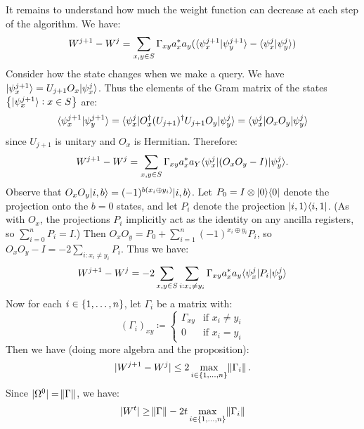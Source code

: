 It remains to understand how much the weight function can decrease at each step of the algorithm. We have:
\begin{equation}
    W^{j+1} - W^j = \sum_{x, y \in S} \Gamma_{xy}a_x^* a_y(\langle \psi_x^{j+1} \lvert \psi_y^{j+1} \rangle - \langle \psi_x^j \lvert \psi_y^j \rangle)
\end{equation}
Consider how the state changes when we make a query. We have $\lvert \psi_x^{j+1} \rangle = U_{j+1}O_x\lvert \psi_x^j \rangle$. Thus the elements of the Gram matrix of the states $\set{\lvert \psi_x^{j+1} \rangle: x \in S}$ are:
\begin{equation}
    \langle \psi_x^{j+1} \lvert \psi_y^{j+1} \rangle = \langle \psi_x^j \rvert O_x^\dagger (U_{j+1})^\dagger U_{j+1}O_y\lvert \psi_y^j \rangle = \langle \psi_x^j \rvert O_xO_y\lvert \psi_y^j \rangle
\end{equation}
since $U_{j+1}$ is unitary and $O_x$ is Hermitian. Therefore:
\begin{equation}
    W^{j+1} - W^j = \sum_{x, y \in S} \Gamma_{xy}a_x^*a_Y\langle \psi^j_x \rvert(O_xO_y - I)\lvert \psi^j_y \rangle.
\end{equation}
Observe that $O_xO_y\lvert i, b \rangle = (-1)^{b(x_i \oplus y_i)}\lvert i, b \rangle$. Let $P_0 = I \otimes \lvert 0 \rangle \langle 0 \rvert$ denote the projection onto the $b = 0$ states, and let $P_i$ denote the projection $\lvert i, 1 \rangle \langle i, 1 \rvert$. (As with $O_x$, the projections $P_i$ implicitly act as the identity on any ancilla registers, so $\sum_{i=0}^n P_i = I$.) Then $O_xO_y = P_0 + \sum_{i=1}^n (-1)^{x_i \oplus y_i}P_i$, so $O_xO_y - I = -2\sum_{i: x_i \neq y_i} P_i$. Thus we have:
\begin{equation}
    W^{j+1} - W^j = -2\sum_{x, y \in S}\sum_{i: x_i \neq y_i} \Gamma_{xy}a_x^* a_y \langle \psi^j_x \rvert P_i\lvert \psi^j_y \rangle
\end{equation}
Now for each $i \in \set{1, \ldots, n}$, let $\Gamma_i$ be a matrix with:
\begin{equation}
    (\Gamma_i)_{xy} \coloneqq \begin{cases}
        \Gamma_{xy} & \text{if $x_i \neq y_i$}
        \\ 0 & \text{if $x_i = y_i$}
    \end{cases}
\end{equation}
Then we have (doing more algebra and the proposition):
\begin{equation}
    \lvert W^{j+1} - W^j \rvert \leq 2\max_{i \in \set{1, \ldots, n}}\norm{\Gamma_i}.
\end{equation}
Since $\lvert \Omega^0 \rvert = \norm{\Gamma}$, we have:
\begin{equation}
    \lvert W^t \rvert \geq \norm{\Gamma} - 2t\max_{i \in \set{1, \ldots, n}}\norm{\Gamma_i}
\end{equation}
